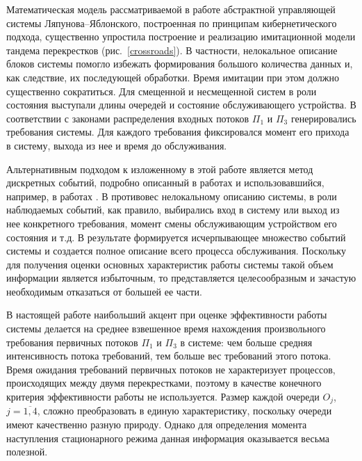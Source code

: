 
Математическая модель рассматриваемой в работе абстрактной управляющей системы Ляпунова--Яблонского, построенная по принципам кибернетического подхода, существенно упростила построение и реализацию имитационной модели тандема перекрестков (рис.~\ref{crossroads}). В частности, нелокальное описание блоков системы помогло избежать формирования большого количества данных и, как следствие, их последующей обработки. Время имитации при этом должно существенно сократиться. Для смещенной и несмещенной систем в роли состояния выступали длины очередей и состояние обслуживающего устройства. В соответствии с законами распределения входных потоков  $\Pi_1$ и $\Pi_3$ генерировались требования системы. Для каждого требования фиксировался момент его прихода в систему, выхода из нее и время до обслуживания.

Альтернативным подходом к изложенному в этой работе является метод дискретных событий, подробно описанный в работах  \cite{AsmussenGlynn,Simulation} и использовавшийся, например, в работах \cite{FedotkinRachinskaya:2016,FedotkinADissertation}. В противовес нелокальному описанию системы, в роли наблюдаемых событий, как правило, выбирались вход в систему или выход из нее конкретного требования, момент смены обслуживающим устройством его состояния и т.д. В результате формируется исчерпывающее множество событий системы и создается полное описание всего процесса обслуживания. Поскольку для получения оценки основных характеристик работы системы такой объем информации является избыточным, то представляется целесообразным и зачастую необходимым отказаться от большей ее части.

В настоящей работе наибольший акцент при оценке эффективности работы системы делается на среднее взвешенное время нахождения произвольного требования первичных потоков $\Pi_1$ и $\Pi_3$ в системе: чем больше средняя интенсивность потока требований, тем больше вес требований этого потока. Время ожидания требований первичных потоков не характеризует процессов, происходящих между двумя перекрестками, поэтому в качестве конечного критерия эффективности работы не используется. Размер каждой очереди $O_j$, $j=\overline{1,4}$, сложно преобразовать в единую характеристику, поскольку очереди имеют качественно разную природу. Однако для определения момента наступления стационарного режима данная информация оказывается весьма полезной.

